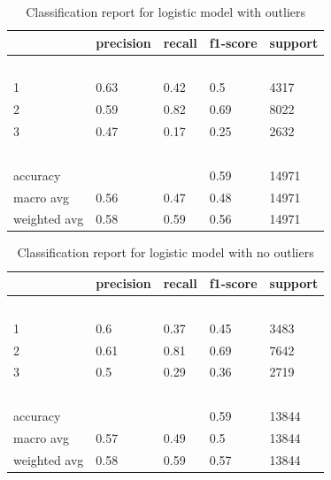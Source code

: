 \documentclass{article}
\begin{document}
\begin{table}[!ht]
    \centering
    \begin{tabular}{|l|l|l|l|l|}
    \hline
        ~ & precision & recall & f1-score & support \\ \hline
        ~ & ~ & ~ & ~ & ~ \\ \hline
        1 & 0.63 & 0.42 & 0.5 & 4317 \\ \hline
        2 & 0.59 & 0.82 & 0.69 & 8022 \\ \hline
        3 & 0.47 & 0.17 & 0.25 & 2632 \\ \hline
        ~ & ~ & ~ & ~ & ~ \\ \hline
        accuracy & ~ & ~ & 0.59 & 14971 \\ \hline
        macro avg & 0.56 & 0.47 & 0.48 & 14971 \\ \hline
        weighted avg & 0.58 & 0.59 & 0.56 & 14971 \\ \hline
    \end{tabular}
    \caption{Classification report for logistic model with outliers}
\end{table}
\begin{table}[!ht]
    \centering
    \begin{tabular}{|l|l|l|l|l|}
    \hline
        ~ & precision & recall & f1-score & support \\ \hline
        ~ & ~ & ~ & ~ & ~ \\ \hline
        1 & 0.6 & 0.37 & 0.45 & 3483 \\ \hline
        2 & 0.61 & 0.81 & 0.69 & 7642 \\ \hline
        3 & 0.5 & 0.29 & 0.36 & 2719 \\ \hline
        ~ & ~ & ~ & ~ & ~ \\ \hline
        accuracy & ~ & ~ & 0.59 & 13844 \\ \hline
        macro avg & 0.57 & 0.49 & 0.5 & 13844 \\ \hline
        weighted avg & 0.58 & 0.59 & 0.57 & 13844 \\ \hline
    \end{tabular}
    \caption{Classification report for logistic model with no outliers}
\end{table}
\pagebreak
\end{document}
